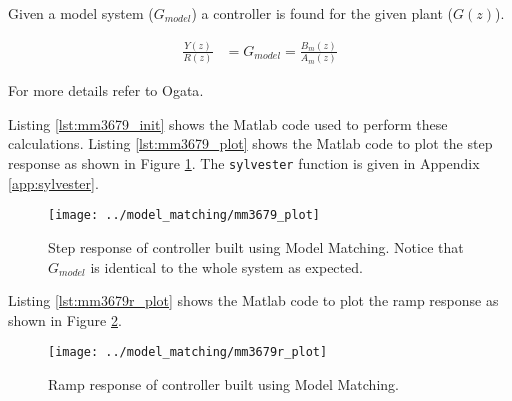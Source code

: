 \documentclass{article}
\newcommand{\sincludepdf}[2][]{
	
}
\begin{document}
Given a model system ($G_{model}$) a controller is found for the
given plant ($G(z)$).

\begin{align}
	\frac{Y(z)}{R(z)} &= G_{model} = \frac{B_m(z)}{A_m(z)}
\end{align}

For more details refer to Ogata\autocite[Pg. 532]{ogata1995discrete}.

\sincludepdf[pages=1,
			pagecommand=\subsection*{Example 1}
	]{scan/11261301.pdf}
\sincludepdf[pages=2-4]{scan/11261301.pdf}

\clearpage
Listing \ref{lst:mm3679_init} shows the Matlab code used to perform
these calculations.
Listing \ref{lst:mm3679_plot} shows the Matlab code to plot the step response
as shown in Figure \ref{fig:mm3679_plot}.
The \verb+sylvester+ function is given in Appendix \ref{app:sylvester}.



\clearpage


\begin{figure}
\begin{center}
\texttt{[image: ../model\_matching/mm3679\_plot]}
\end{center}
\caption{Step response of controller built using Model Matching.
Notice that $G_{model}$ is identical to the whole system as expected.}
\label{fig:mm3679_plot}
\end{figure}

\clearpage
Listing \ref{lst:mm3679r_plot} shows the Matlab code to plot the ramp response
as shown in Figure \ref{fig:mm3679r_plot}.



\begin{figure}
\begin{center}
\texttt{[image: ../model\_matching/mm3679r\_plot]}
\end{center}
\caption{Ramp response of controller built using Model Matching.}
\label{fig:mm3679r_plot}
\end{figure}
\end{document}
